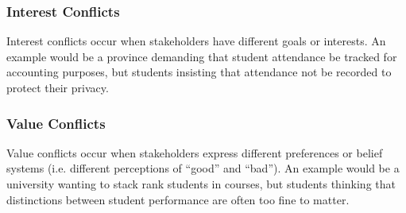 \documentclass[12pt,titlepage]{article}
\begin{document}
      \subsubsection{Interest Conflicts}
        Interest conflicts occur when stakeholders have different goals or interests. An example would be a province demanding that student
        attendance be tracked for accounting purposes, but students insisting that attendance not be recorded to protect their privacy.

      \subsubsection{Value Conflicts}
        Value conflicts occur when stakeholders express different preferences or belief systems (i.e. different perceptions of ``good'' and ``bad'').
        An example would be a university wanting to stack rank students in courses, but students thinking that distinctions between student
        performance are often too fine to matter.
\end{document}
